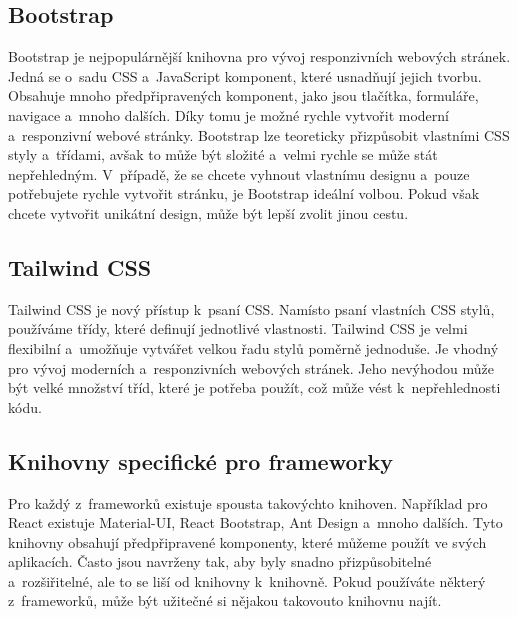 \subsection*{Bootstrap}
\label{subsec:bootstrap}

Bootstrap je nejpopulárnější knihovna pro vývoj responzivních webových stránek. Jedná se o~sadu CSS a~JavaScript komponent, které usnadňují jejich tvorbu. Obsahuje mnoho předpřipravených komponent, jako jsou tlačítka, formuláře, navigace a~mnoho dalších. Díky tomu je možné rychle vytvořit moderní a~responzivní webové stránky. Bootstrap lze teoreticky přizpůsobit vlastními CSS styly a~třídami, avšak to může být složité a~velmi rychle se může stát nepřehledným. V~případě, že se chcete vyhnout vlastnímu designu a~pouze potřebujete rychle vytvořit stránku, je Bootstrap ideální volbou. Pokud však chcete vytvořit unikátní design, může být lepší zvolit jinou cestu.

\subsection*{Tailwind CSS}
\label{subsec:tailwind-css}

Tailwind CSS je nový přístup k~psaní CSS. Namísto psaní vlastních CSS stylů, používáme třídy, které definují jednotlivé vlastnosti. Tailwind CSS je velmi flexibilní a~umožňuje vytvářet velkou řadu stylů poměrně jednoduše. Je vhodný pro vývoj moderních a~responzivních webových stránek. Jeho nevýhodou může být velké množství tříd, které je potřeba použít, což může vést k~nepřehlednosti kódu.

\subsection*{Knihovny specifické pro frameworky}
\label{subsec:framework-specific-libraries}

Pro každý z~frameworků existuje spousta takovýchto knihoven. Například pro React existuje Material-UI, React Bootstrap, Ant Design a~mnoho dalších. Tyto knihovny obsahují předpřipravené komponenty, které můžeme použít ve svých aplikacích. Často jsou navrženy tak, aby byly snadno přizpůsobitelné a~rozšiřitelné, ale to se liší od knihovny k~knihovně. Pokud používáte některý z~frameworků, může být užitečné si nějakou takovouto knihovnu najít.

